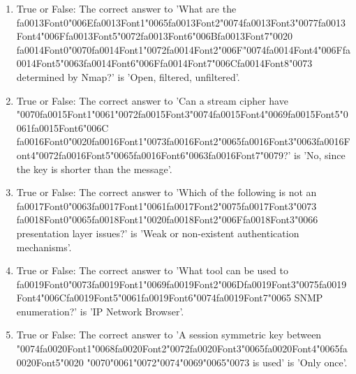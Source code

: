 \documentclass[12pt]{article}
\begin{document}
\begin{enumerate}[label=\arabic*.]
\item True or False: The correct answer to 'What are the {\csname fa0013Font0\endcsname\char"006E}{\csname fa0013Font1\endcsname\char"0065}{\csname fa0013Font2\endcsname\char"0074}{\csname fa0013Font3\endcsname\char"0077}{\csname fa0013Font4\endcsname\char"006F}{\csname fa0013Font5\endcsname\char"0072}{\csname fa0013Font6\endcsname\char"006B}{\csname fa0013Font7\endcsname\char"0020} {\csname fa0014Font0\endcsname\char"0070}{\csname fa0014Font1\endcsname\char"0072}{\csname fa0014Font2\endcsname\char"006F}{\char"0074}{\csname fa0014Font4\endcsname\char"006F}{\csname fa0014Font5\endcsname\char"0063}{\csname fa0014Font6\endcsname\char"006F}{\csname fa0014Font7\endcsname\char"006C}{\csname fa0014Font8\endcsname\char"0073} determined by Nmap?' is 'Open, filtered, unfiltered'.
\item True or False: The correct answer to 'Can a stream cipher have {\char"0070}{\csname fa0015Font1\endcsname\char"0061}{\char"0072}{\csname fa0015Font3\endcsname\char"0074}{\csname fa0015Font4\endcsname\char"0069}{\csname fa0015Font5\endcsname\char"0061}{\csname fa0015Font6\endcsname\char"006C} {\csname fa0016Font0\endcsname\char"0020}{\csname fa0016Font1\endcsname\char"0073}{\csname fa0016Font2\endcsname\char"0065}{\csname fa0016Font3\endcsname\char"0063}{\csname fa0016Font4\endcsname\char"0072}{\csname fa0016Font5\endcsname\char"0065}{\csname fa0016Font6\endcsname\char"0063}{\csname fa0016Font7\endcsname\char"0079}?' is 'No, since the key is shorter than the message'.
\item True or False: The correct answer to 'Which of the following is not an {\csname fa0017Font0\endcsname\char"0063}{\csname fa0017Font1\endcsname\char"0061}{\csname fa0017Font2\endcsname\char"0075}{\csname fa0017Font3\endcsname\char"0073} {\csname fa0018Font0\endcsname\char"0065}{\csname fa0018Font1\endcsname\char"0020}{\csname fa0018Font2\endcsname\char"006F}{\csname fa0018Font3\endcsname\char"0066} presentation layer issues?' is 'Weak or non-existent authentication mechanisms'.
\item True or False: The correct answer to 'What tool can be used to {\csname fa0019Font0\endcsname\char"0073}{\csname fa0019Font1\endcsname\char"0069}{\csname fa0019Font2\endcsname\char"006D}{\csname fa0019Font3\endcsname\char"0075}{\csname fa0019Font4\endcsname\char"006C}{\csname fa0019Font5\endcsname\char"0061}{\csname fa0019Font6\endcsname\char"0074}{\csname fa0019Font7\endcsname\char"0065} SNMP enumeration?' is 'IP Network Browser'.
\item True or False: The correct answer to 'A session symmetric key between {\char"0074}{\csname fa0020Font1\endcsname\char"0068}{\csname fa0020Font2\endcsname\char"0072}{\csname fa0020Font3\endcsname\char"0065}{\csname fa0020Font4\endcsname\char"0065}{\csname fa0020Font5\endcsname\char"0020} {\char"0070}{\char"0061}{\char"0072}{\char"0074}{\char"0069}{\char"0065}{\char"0073} is used' is 'Only once'.

\end{enumerate}
\end{document}
